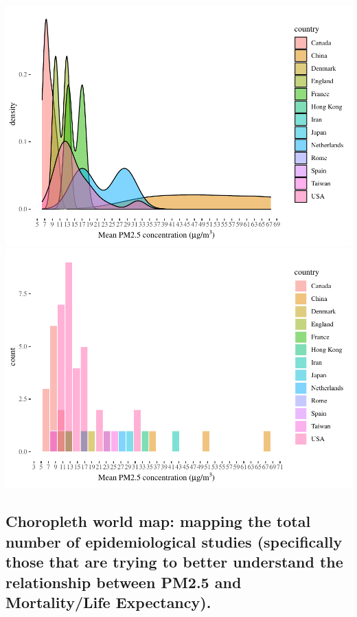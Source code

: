 \documentclass[
]{article}
\begin{document}
\includegraphics[width=1\linewidth]{man/figures/README-mean_pm2.5_country_wise-1}
\includegraphics[width=1\linewidth]{man/figures/README-mean_pm2.5_country_wise-2}

\hypertarget{choropleth-world-map-mapping-the-total-number-of-epidemiological-studies-specifically-those-that-are-trying-to-better-understand-the-relationship-between-pm2.5-and-mortalitylife-expectancy.}{%
\subsection{Choropleth world map: mapping the total number of
epidemiological studies (specifically those that are trying to better
understand the relationship between PM2.5 and Mortality/Life
Expectancy).}\label{choropleth-world-map-mapping-the-total-number-of-epidemiological-studies-specifically-those-that-are-trying-to-better-understand-the-relationship-between-pm2.5-and-mortalitylife-expectancy.}}
\end{document}
